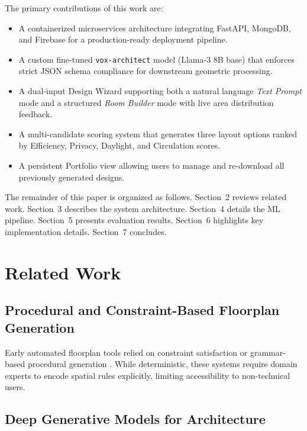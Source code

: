 \documentclass[12pt, a4paper]{article}
\begin{document}
The primary contributions of this work are:

\begin{itemize}[leftmargin=1.5em, itemsep=2pt]
    \item A containerized microservices architecture integrating FastAPI, MongoDB,
          and Firebase for a production-ready deployment pipeline.
    \item A custom fine-tuned \texttt{vox-architect} model (Llama-3 8B base)
          that enforces strict JSON schema compliance for downstream geometric
          processing.
    \item A dual-input Design Wizard supporting both a natural language
          \textit{Text Prompt} mode and a structured \textit{Room Builder} mode
          with live area distribution feedback.
    \item A multi-candidate scoring system that generates three layout options
          ranked by Efficiency, Privacy, Daylight, and Circulation scores.
    \item A persistent Portfolio view allowing users to manage and re-download
          all previously generated designs.
\end{itemize}

The remainder of this paper is organized as follows. Section~2 reviews related
work. Section~3 describes the system architecture. Section~4 details the ML
pipeline. Section~5 presents evaluation results. Section~6 highlights key
implementation details. Section~7 concludes.

\section{Related Work}

\subsection{Procedural and Constraint-Based Floorplan Generation}

Early automated floorplan tools relied on constraint satisfaction or grammar-based
procedural generation \cite{merrell2010computer}. While deterministic, these
systems require domain experts to encode spatial rules explicitly, limiting
accessibility to non-technical users.

\subsection{Deep Generative Models for Architecture}
\end{document}
